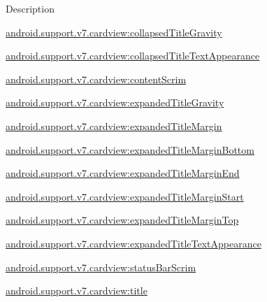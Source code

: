Description 

{\ttfamily \hyperlink{classandroid_1_1support_1_1v7_1_1cardview_1_1R_1_1styleable_aca98ea1812eddbb1cc47a7e5900bd6ac}{android.\+support.\+v7.\+cardview\+:collapsed\+Title\+Gravity}}

{\ttfamily \hyperlink{classandroid_1_1support_1_1v7_1_1cardview_1_1R_1_1styleable_ad3a48e5593ffa8db03af733e76a429f2}{android.\+support.\+v7.\+cardview\+:collapsed\+Title\+Text\+Appearance}}

{\ttfamily \hyperlink{classandroid_1_1support_1_1v7_1_1cardview_1_1R_1_1styleable_a4788b65165005d22b0fc4665a27806a3}{android.\+support.\+v7.\+cardview\+:content\+Scrim}}

{\ttfamily \hyperlink{classandroid_1_1support_1_1v7_1_1cardview_1_1R_1_1styleable_aea2383ec907327db77221d2a33d06306}{android.\+support.\+v7.\+cardview\+:expanded\+Title\+Gravity}}

{\ttfamily \hyperlink{classandroid_1_1support_1_1v7_1_1cardview_1_1R_1_1styleable_af7f7bf893630b5286fdcaec73cb489c5}{android.\+support.\+v7.\+cardview\+:expanded\+Title\+Margin}}

{\ttfamily \hyperlink{classandroid_1_1support_1_1v7_1_1cardview_1_1R_1_1styleable_ad9b7a75fc3bd07996d8b38480cb5e7a2}{android.\+support.\+v7.\+cardview\+:expanded\+Title\+Margin\+Bottom}}

{\ttfamily \hyperlink{classandroid_1_1support_1_1v7_1_1cardview_1_1R_1_1styleable_a9ba764a19d59fb616535b8b928a3ab0c}{android.\+support.\+v7.\+cardview\+:expanded\+Title\+Margin\+End}}

{\ttfamily \hyperlink{classandroid_1_1support_1_1v7_1_1cardview_1_1R_1_1styleable_a9da9e2540ee41e2bf5cf6e02ca2d940f}{android.\+support.\+v7.\+cardview\+:expanded\+Title\+Margin\+Start}}

{\ttfamily \hyperlink{classandroid_1_1support_1_1v7_1_1cardview_1_1R_1_1styleable_adb4d112ba91dd0c5abf011eb88af2a2b}{android.\+support.\+v7.\+cardview\+:expanded\+Title\+Margin\+Top}}

{\ttfamily \hyperlink{classandroid_1_1support_1_1v7_1_1cardview_1_1R_1_1styleable_a216b5b490333f10034ece0d07367bcf2}{android.\+support.\+v7.\+cardview\+:expanded\+Title\+Text\+Appearance}}

{\ttfamily \hyperlink{classandroid_1_1support_1_1v7_1_1cardview_1_1R_1_1styleable_ac95b8a59eb9582467255c194e9d8546c}{android.\+support.\+v7.\+cardview\+:status\+Bar\+Scrim}}

{\ttfamily \hyperlink{classandroid_1_1support_1_1v7_1_1cardview_1_1R_1_1styleable_a7bb1d248c841d16154184e1f8bbc0581}{android.\+support.\+v7.\+cardview\+:title}}

